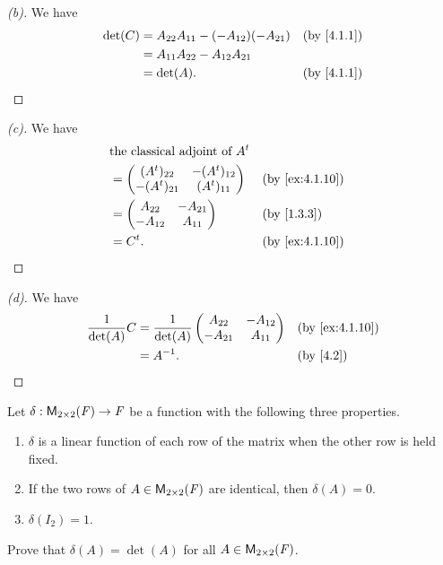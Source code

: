 \begin{proof}[(b)]
	We have
	\begin{align*}
		\det(C) & = A_{2 2} A_{1 1} - (-A_{1 2}) (-A_{2 1}) &  & \by{4.1.1} \\
		        & = A_{1 1} A_{2 2} - A_{1 2} A_{2 1}                       \\
		        & = \det(A).                                &  & \by{4.1.1}
	\end{align*}
\end{proof}

\begin{proof}[(c)]
	We have
	\begin{align*}
		 & \text{the classical adjoint of } \tp{A}                     \\
		 & = \begin{pmatrix}
			     (\tp{A})_{2 2}  & -(\tp{A})_{1 2} \\
			     -(\tp{A})_{2 1} & (\tp{A})_{1 1}
		     \end{pmatrix}    &  & \by{ex:4.1.10}                      \\
		 & = \begin{pmatrix}
			     A_{2 2}  & -A_{2 1} \\
			     -A_{1 2} & A_{1 1}
		     \end{pmatrix}                  &  & \by{1.3.3}            \\
		 & = \tp{C}.                               &  & \by{ex:4.1.10}
	\end{align*}
\end{proof}

\begin{proof}[(d)]
	We have
	\begin{align*}
		\frac{1}{\det(A)} C & = \frac{1}{\det(A)} \begin{pmatrix}
			                                          A_{2 2}  & -A_{1 2} \\
			                                          -A_{2 1} & A_{1 1}
		                                          \end{pmatrix} &  & \by{ex:4.1.10} \\
		                    & = A^{-1}.                           &  & \by{4.2}
	\end{align*}
\end{proof}

\begin{ex}\label{ex:4.1.11}
	Let \(\delta : \ms[2][2][\F] \to \F\) be a function with the following three properties.
	\begin{enumerate}
		\item \(\delta\) is a linear function of each row of the matrix when the other row is held fixed.
		\item If the two rows of \(A \in \ms[2][2][\F]\) are identical, then \(\delta(A) = 0\).
		\item \(\delta(I_2) = 1\).
	\end{enumerate}
	Prove that \(\delta(A) = \det(A)\) for all \(A \in \ms[2][2][\F]\).
\end{ex}

